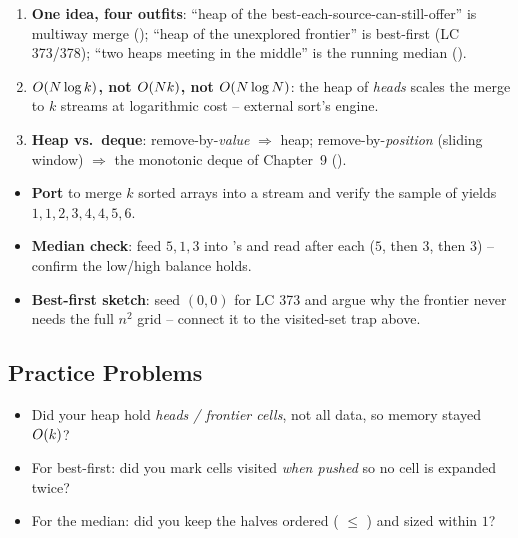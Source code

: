 \begin{insightbox}
\begin{enumerate}[nosep, leftmargin=1.6em]
  \item \textbf{One idea, four outfits}: ``heap of the best-each-source-can-still-offer'' is multiway merge
        (); ``heap of the unexplored frontier'' is best-first (LC 373/378); ``two heaps
        meeting in the middle'' is the running median ().
  \item \textbf{$O(N\log k)$, not $O(Nk)$, not $O(N\log N)$}: the heap of \emph{heads} scales the
        merge to $k$ streams at logarithmic cost -- external sort's engine.
  \item \textbf{Heap vs.\ deque}: remove-by-\emph{value} $\Rightarrow$ heap; remove-by-\emph{position}
        (sliding window) $\Rightarrow$ the monotonic deque of Chapter~9 ().
\end{enumerate}
\end{insightbox}

\begin{hardeningbox}
\begin{itemize}[nosep, leftmargin=1.4em]
  \item \textbf{Port } to merge $k$ sorted arrays into a stream and verify the sample
        of  yields $1,1,2,3,4,4,5,6$.
  \item \textbf{Median check}: feed $5,1,3$ into 's  and read 
        after each ($5$, then $3$, then $3$) -- confirm the low/high balance holds.
  \item \textbf{Best-first sketch}: seed $(0,0)$ for LC 373 and argue why the frontier never needs the full
        $n^2$ grid -- connect it to the visited-set trap above.
\end{itemize}
\end{hardeningbox}

\subsection{Practice Problems}

\begin{stuckbox}
\begin{itemize}[nosep, leftmargin=1.4em]
  \item Did your heap hold \emph{heads / frontier cells}, not all data, so memory stayed $O(k)$?
  \item For best-first: did you mark cells visited \emph{when pushed} so no cell is expanded twice?
  \item For the median: did you keep the halves ordered ( $\le$ ) and sized within $1$?
\end{itemize}
\end{stuckbox}

